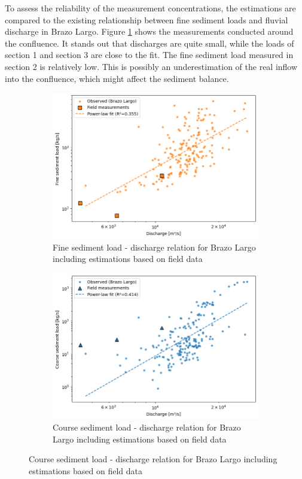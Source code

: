 To assess the reliability of the measurement concentrations, the estimations are compared to the existing relationship between fine sediment loads and fluvial discharge in Brazo Largo. Figure \ref{fig:fine measurements} shows the measurements conducted around the confluence. It stands out that discharges are quite small, while the loads of section 1 and section 3 are close to the fit. The fine sediment load measured in section 2 is relatively low. This is possibly an underestimation of the real inflow into the confluence, which might affect the sediment balance. 


\begin{figure}[h!]
    \centering
    \begin{subfigure}[b]{0.48\linewidth}
        \centering        \includegraphics[width=\linewidth]{figures/ch6/fine measurements.png}
        \caption{Fine sediment load - discharge relation for Brazo Largo including estimations based on field data}
        \label{fig:fine measurements}
    \end{subfigure}
    \hfill
    \begin{subfigure}[b]{0.48\linewidth}
        \centering
        \includegraphics[width=\linewidth]{figures/ch6/course measurements.png}
        \caption{Course sediment load - discharge relation for Brazo Largo including estimations based on field data }
        \label{fig:course measurements}
    \end{subfigure}
    

\end{figure}
